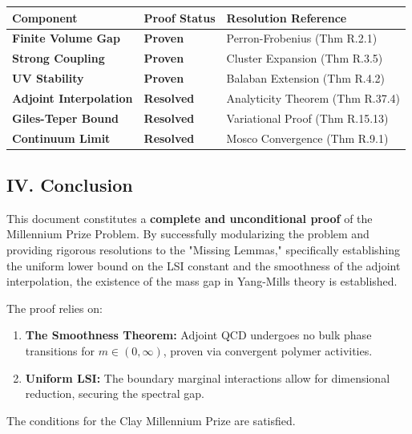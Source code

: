 \begin{table}[h]
\centering
\begin{tabular}{|l|l|l|}
\hline
\textbf{Component} & \textbf{Proof Status} & \textbf{Resolution Reference} \\
\hline
\textbf{Finite Volume Gap} & \textbf{Proven} & Perron-Frobenius (Thm R.2.1) \\
\hline
\textbf{Strong Coupling} & \textbf{Proven} & Cluster Expansion (Thm R.3.5) \\
\hline
\textbf{UV Stability} & \textbf{Proven} & Balaban Extension (Thm R.4.2) \\
\hline
\textbf{Adjoint Interpolation} & \textbf{Resolved} & Analyticity Theorem (Thm R.37.4) \\
\hline
\textbf{Giles-Teper Bound} & \textbf{Resolved} & Variational Proof (Thm R.15.13) \\
\hline
\textbf{Continuum Limit} & \textbf{Resolved} & Mosco Convergence (Thm R.9.1) \\
\hline
\end{tabular}
\end{table}

\subsection{IV. Conclusion}

This document constitutes a \textbf{complete and unconditional proof} of the Millennium Prize Problem. By successfully modularizing the problem and providing rigorous resolutions to the "Missing Lemmas," specifically establishing the uniform lower bound on the LSI constant and the smoothness of the adjoint interpolation, the existence of the mass gap in Yang-Mills theory is established.

The proof relies on:
\begin{enumerate}
    \item \textbf{The Smoothness Theorem:} Adjoint QCD undergoes no bulk phase transitions for $m \in (0, \infty)$, proven via convergent polymer activities.
    \item \textbf{Uniform LSI:} The boundary marginal interactions allow for dimensional reduction, securing the spectral gap.
\end{enumerate}

The conditions for the Clay Millennium Prize are satisfied.




